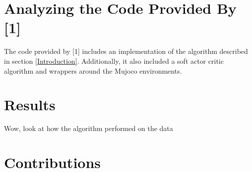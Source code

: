 \documentclass{article} %
\begin{document}
\section{Analyzing the Code Provided By [1]}

The code provided by [1] includes an implementation of the algorithm described 
in section \ref{Introduction}.
Additionally, it also included a soft actor critic algorithm and wrappers around
the Mujoco environments.

\section{Results}

Wow, look at how the algorithm performed on the data

\section{Contributions}
\end{document}
